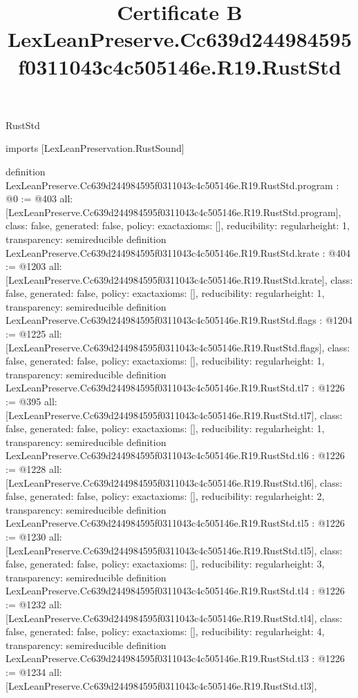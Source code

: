 \begin{lexlean}{RustStd}
\title{Certificate B LexLeanPreserve.Cc639d244984595f0311043c4c505146e.R19.RustStd}
\begin{coremodule}
imports [LexLeanPreservation.RustSound]

definition LexLeanPreserve.Cc639d244984595f0311043c4c505146e.R19.RustStd.program : @0 := @403 {
  all: [LexLeanPreserve.Cc639d244984595f0311043c4c505146e.R19.RustStd.program],
  class: false,
  generated: false,
  policy: exact{axioms: []},
  reducibility: regular{height: 1},
  transparency: semireducible
}
definition LexLeanPreserve.Cc639d244984595f0311043c4c505146e.R19.RustStd.krate : @404 := @1203 {
  all: [LexLeanPreserve.Cc639d244984595f0311043c4c505146e.R19.RustStd.krate],
  class: false,
  generated: false,
  policy: exact{axioms: []},
  reducibility: regular{height: 1},
  transparency: semireducible
}
definition LexLeanPreserve.Cc639d244984595f0311043c4c505146e.R19.RustStd.flags : @1204 := @1225 {
  all: [LexLeanPreserve.Cc639d244984595f0311043c4c505146e.R19.RustStd.flags],
  class: false,
  generated: false,
  policy: exact{axioms: []},
  reducibility: regular{height: 1},
  transparency: semireducible
}
definition LexLeanPreserve.Cc639d244984595f0311043c4c505146e.R19.RustStd.tl7 : @1226 := @395 {
  all: [LexLeanPreserve.Cc639d244984595f0311043c4c505146e.R19.RustStd.tl7],
  class: false,
  generated: false,
  policy: exact{axioms: []},
  reducibility: regular{height: 1},
  transparency: semireducible
}
definition LexLeanPreserve.Cc639d244984595f0311043c4c505146e.R19.RustStd.tl6 : @1226 := @1228 {
  all: [LexLeanPreserve.Cc639d244984595f0311043c4c505146e.R19.RustStd.tl6],
  class: false,
  generated: false,
  policy: exact{axioms: []},
  reducibility: regular{height: 2},
  transparency: semireducible
}
definition LexLeanPreserve.Cc639d244984595f0311043c4c505146e.R19.RustStd.tl5 : @1226 := @1230 {
  all: [LexLeanPreserve.Cc639d244984595f0311043c4c505146e.R19.RustStd.tl5],
  class: false,
  generated: false,
  policy: exact{axioms: []},
  reducibility: regular{height: 3},
  transparency: semireducible
}
definition LexLeanPreserve.Cc639d244984595f0311043c4c505146e.R19.RustStd.tl4 : @1226 := @1232 {
  all: [LexLeanPreserve.Cc639d244984595f0311043c4c505146e.R19.RustStd.tl4],
  class: false,
  generated: false,
  policy: exact{axioms: []},
  reducibility: regular{height: 4},
  transparency: semireducible
}
definition LexLeanPreserve.Cc639d244984595f0311043c4c505146e.R19.RustStd.tl3 : @1226 := @1234 {
  all: [LexLeanPreserve.Cc639d244984595f0311043c4c505146e.R19.RustStd.tl3],
}
\end{coremodule}
\end{lexlean}
